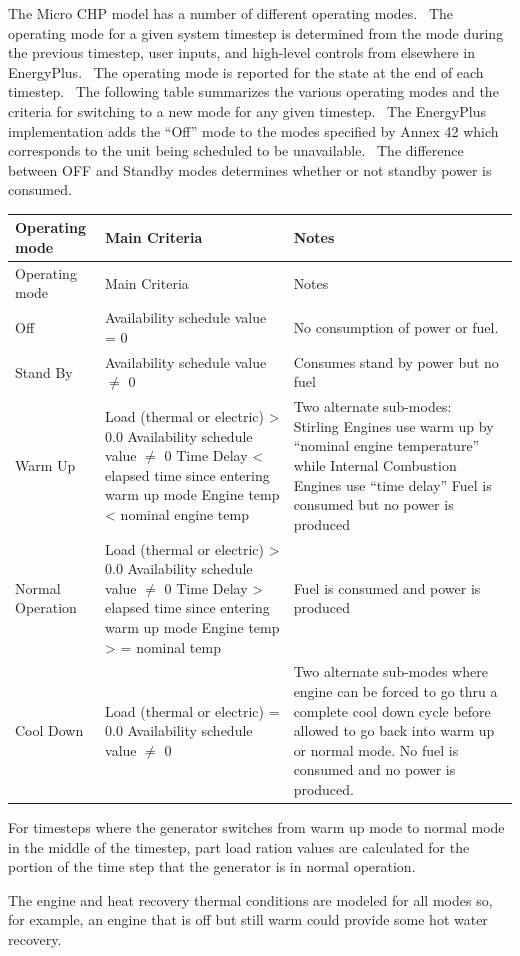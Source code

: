 The Micro CHP model has a number of different operating modes.~ The operating mode for a given system timestep is determined from the mode during the previous timestep, user inputs, and high-level controls from elsewhere in EnergyPlus.~ The operating mode is reported for the state at the end of each timestep.~ The following table summarizes the various operating modes and the criteria for switching to a new mode for any given timestep.~ The EnergyPlus implementation adds the ``Off'' mode to the modes specified by Annex 42 which corresponds to the unit being scheduled to be unavailable.~ The difference between OFF and Standby modes determines whether or not standby power is consumed.

\begin{longtable}[c]{p{1.5in}p{2.05in}p{2.44in}}
\toprule
Operating mode & Main Criteria & Notes \tabularnewline
\midrule
\endfirsthead

\toprule
Operating mode & Main Criteria & Notes \tabularnewline
\midrule
\endhead

Off & Availability schedule value = 0 & No consumption of power or fuel. \tabularnewline
Stand By & Availability schedule value \(\neq\) 0 & Consumes stand by power but no fuel \tabularnewline
Warm Up & Load (thermal or electric)  >  0.0 Availability schedule value \(\neq\) 0 Time Delay  <  elapsed time since entering warm up mode Engine temp  <  nominal engine temp & Two alternate sub-modes:~ Stirling Engines use warm up by “nominal engine temperature” while Internal Combustion Engines use “time delay” Fuel is consumed but no power is produced \tabularnewline
Normal Operation & Load (thermal or electric)  >  0.0 Availability schedule value \(\neq\) 0 Time Delay  >  elapsed time since entering warm up mode Engine temp  > = nominal temp & Fuel is consumed and power is produced \tabularnewline
Cool Down & Load (thermal or electric) = 0.0 Availability schedule value \(\neq\) 0 & Two alternate sub-modes where engine can be forced to go thru a complete cool down cycle before allowed to go back into warm up or normal mode. No fuel is consumed and no power is produced. \tabularnewline
\bottomrule
\end{longtable}

For timesteps where the generator switches from warm up mode to normal mode in the middle of the timestep, part load ration values are calculated for the portion of the time step that the generator is in normal operation.

The engine and heat recovery thermal conditions are modeled for all modes so, for example, an engine that is off but still warm could provide some hot water recovery.

